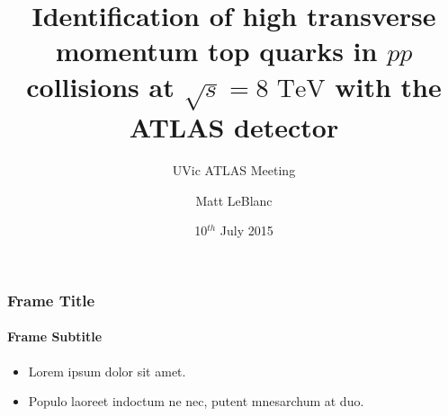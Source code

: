 %
%



\title[Top-Tagging Approval]{Identification of high transverse momentum top quarks in $pp$ collisions at $\sqrt{s}=8\text{ TeV}$ with the ATLAS detector}
\subtitle{UVic ATLAS Meeting}
\author[MLB]{Matt LeBlanc}
\date[2015-07-10]{10$^{th}$ July 2015}





{
%
\begin{frame}[plain]
	\titlepage
	\vspace{1.75cm} %
\end{frame}
}

\begin{frame}
	\frametitle{Frame Title}
	\framesubtitle{Frame Subtitle}
	\begin{itemize}
		\item Lorem ipsum dolor sit amet.
		\item Populo laoreet indoctum ne nec, putent mnesarchum at duo.
	\end{itemize}
\end{frame}


